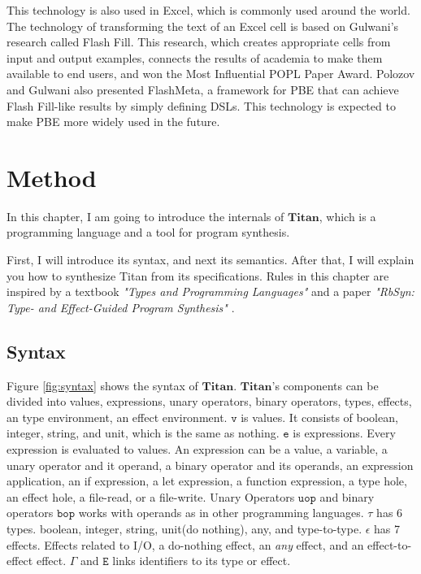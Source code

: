 \documentclass[12pt, a4paper, titlepage]{report}
\begin{document}
    This technology is also used in Excel, which is commonly used around the world.
    The technology of transforming the text of an Excel cell is based on Gulwani's research called Flash Fill\cite{gulwani:2011}.
    This research, which creates appropriate cells from input and output examples, connects the results of academia to make them available to end users, and won the Most Influential POPL Paper Award.
    Polozov and Gulwani also presented FlashMeta\cite{polozov:2015}, a framework for PBE that can achieve Flash Fill-like results by simply defining DSLs.
    This technology is expected to make PBE more widely used in the future.



\chapter{Method}\label{chapter:method}
  In this chapter, I am going to introduce the internals of $\mathbf{Titan}$, which is a programming language and a tool for program synthesis.

  First, I will introduce its syntax, and next its semantics.
  After that, I will explain you how to synthesize Titan from its specifications.
  Rules in this chapter are inspired by a textbook \emph{"Types and Programming Languages"} \cite{pierce:2002} and a paper \emph{"RbSyn: Type- and Effect-Guided Program Synthesis"} \cite{guria:2021}.
  \section{Syntax}\label{section:syntax}
    Figure \ref{fig:syntax} shows the syntax of $\mathbf{Titan}$.
    $\mathbf{Titan}$'s components can be divided into values, expressions, unary operators, binary operators, types, effects, an type environment, an effect environment.
    $\mathtt{v}$ is values. It consists of boolean, integer, string, and unit, which is the same as nothing.
    $\mathtt{e}$ is expressions. Every expression is evaluated to values.
    An expression can be a value, a variable, a unary operator and it operand, a binary operator and its operands, an expression application, an if expression, a let expression, a function expression, a type hole, an effect hole, a file-read, or a file-write.
    Unary Operators $\mathtt{uop}$ and binary operators $\mathtt{bop}$ works with operands as in other programming languages.
    $\mathtt{\tau}$ has 6 types. boolean, integer, string, unit(do nothing), any, and type-to-type.
    $\mathtt{\epsilon}$ has 7 effects. Effects related to I/O, a do-nothing effect, an \textit{any} effect, and an effect-to-effect effect.
    $\mathtt{\Gamma}$ and $\mathtt{E}$ links identifiers to its type or effect.
\end{document}
